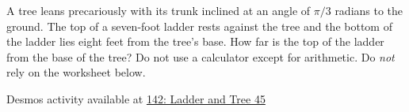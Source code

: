 \documentclass{ximera}
\begin{document}
\begin{question} \label{QLMVVEVEeddf}
A tree leans precariously with its trunk inclined at an angle of $\pi/3$ radians to the ground. The top of a seven-foot ladder rests against the tree and the bottom of the ladder lies eight feet from the tree's base. How far is the top of the ladder from the base of the tree? Do not use a calculator except for arithmetic. Do \emph{not} rely on the worksheet below.

\begin{onlineOnly}
    \begin{center}
\end{center}
\end{onlineOnly}

Desmos activity available at \href{https://www.desmos.com/calculator/sjmjseyqyp}{142: Ladder and Tree 45}


\end{question}
\end{document}
